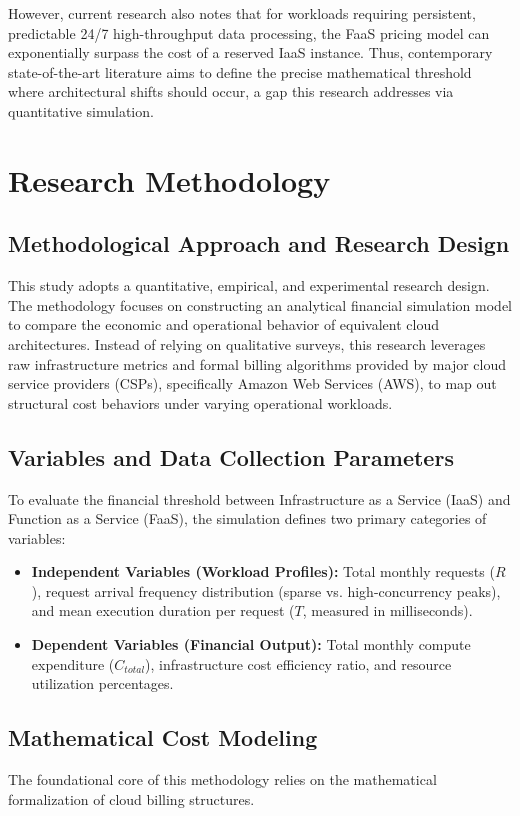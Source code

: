 \documentclass[conference]{IEEEtran}
\begin{document}
However, current research also notes that for workloads requiring persistent, predictable 24/7 high-throughput data processing, the FaaS pricing model can exponentially surpass the cost of a reserved IaaS instance. Thus, contemporary state-of-the-art literature aims to define the precise mathematical threshold where architectural shifts should occur, a gap this research addresses via quantitative simulation.

\section{Research Methodology}

\subsection{Methodological Approach and Research Design}
This study adopts a quantitative, empirical, and experimental research design. The methodology focuses on constructing an analytical financial simulation model to compare the economic and operational behavior of equivalent cloud architectures. Instead of relying on qualitative surveys, this research leverages raw infrastructure metrics and formal billing algorithms provided by major cloud service providers (CSPs), specifically Amazon Web Services (AWS), to map out structural cost behaviors under varying operational workloads.

\subsection{Variables and Data Collection Parameters}
To evaluate the financial threshold between Infrastructure as a Service (IaaS) and Function as a Service (FaaS), the simulation defines two primary categories of variables:

\begin{itemize}
    \item \textbf{Independent Variables (Workload Profiles):} Total monthly requests ($R$), request arrival frequency distribution (sparse vs. high-concurrency peaks), and mean execution duration per request ($T$, measured in milliseconds).
    \item \textbf{Dependent Variables (Financial Output):} Total monthly compute expenditure ($C_{total}$), infrastructure cost efficiency ratio, and resource utilization percentages.
\end{itemize}

\subsection{Mathematical Cost Modeling}
The foundational core of this methodology relies on the mathematical formalization of cloud billing structures. 
\end{document}
